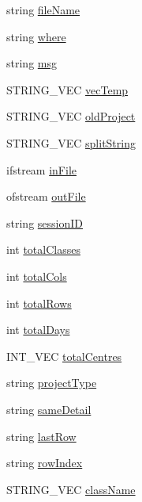 \begin{DoxyCompactItemize}
\item 
string \hyperlink{classInputDetail_a4a7fb27e52bed0f40de143634f2c486b}{file\-Name}
\item 
string \hyperlink{classInputDetail_a79d8a59940f25f4d2089e241c71a4279}{where}
\item 
string \hyperlink{classInputDetail_a1abb16cd695678c3fa05e3c812823fee}{msg}
\item 
S\-T\-R\-I\-N\-G\-\_\-\-V\-E\-C \hyperlink{classInputDetail_abee6a659eb2e34b260aaf8b05d6003b4}{vec\-Temp}
\item 
S\-T\-R\-I\-N\-G\-\_\-\-V\-E\-C \hyperlink{classInputDetail_ae8ccc2e838c6d5a93ea544370dc1f272}{old\-Project}
\item 
S\-T\-R\-I\-N\-G\-\_\-\-V\-E\-C \hyperlink{classInputDetail_ab09ed4176090a72237531cedf00afb41}{split\-String}
\item 
ifstream \hyperlink{classInputDetail_a4c62c1934fbfcdcc8e2afaee44a87c15}{in\-File}
\item 
ofstream \hyperlink{classInputDetail_a2b8484cfbfee98ae69e8476f8fd40000}{out\-File}
\item 
string \hyperlink{classInputDetail_a1f276e4df260009d465032ec64f3a543}{session\-I\-D}
\item 
int \hyperlink{classInputDetail_aac4c49f5453d86c4c79bcb87361ad28d}{total\-Classes}
\item 
int \hyperlink{classInputDetail_aeba19a14044746fd0c87b356d05d88c0}{total\-Cols}
\item 
int \hyperlink{classInputDetail_a3710702eafae009629e99f1dc76d5285}{total\-Rows}
\item 
int \hyperlink{classInputDetail_a8d1ba029791bb9b87330400d82cdbcde}{total\-Days}
\item 
I\-N\-T\-\_\-\-V\-E\-C \hyperlink{classInputDetail_a11f9eb0c33682bf3c9b1e2cac50ebaad}{total\-Centres}
\item 
string \hyperlink{classInputDetail_ad2c46fdc8093eb88e01497e55b2e8e4d}{project\-Type}
\item 
string \hyperlink{classInputDetail_a13313d76b2ccc308634a7d802a46936a}{same\-Detail}
\item 
string \hyperlink{classInputDetail_a8e266c7e4fae2e36b254fec63e20d88a}{last\-Row}
\item 
string \hyperlink{classInputDetail_a8294712a038ec4934eec54c835b20d23}{row\-Index}
\item 
S\-T\-R\-I\-N\-G\-\_\-\-V\-E\-C \hyperlink{classInputDetail_a6ee80d01e417bea608374ba83e17b425}{class\-Name}
\item 

\end{DoxyCompactItemize}

